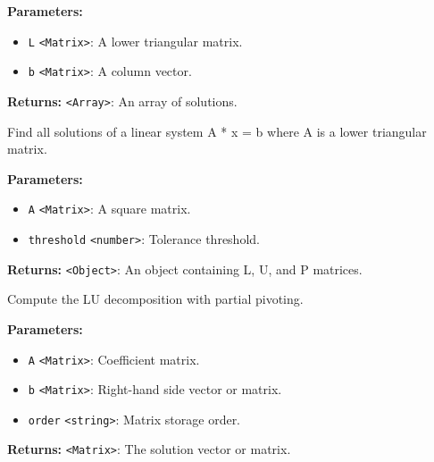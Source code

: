 \documentclass[12pt,a4paper]{article}
\begin{document}
\vspace{5mm}
\noindent {}


\noindent \textbf{Parameters:}
\begin{itemize}
  \item \texttt{L} \texttt{<Matrix>}: A lower triangular matrix.
  \item \texttt{b} \texttt{<Matrix>}: A column vector.
\end{itemize}

\noindent \textbf{Returns:} \texttt{<Array>}: An array of solutions.

\noindent Find all solutions of a linear system A * x = b where A is a lower triangular matrix.

\vspace{5mm}
\noindent {}


\noindent \textbf{Parameters:}
\begin{itemize}
  \item \texttt{A} \texttt{<Matrix>}: A square matrix.
  \item \texttt{threshold} \texttt{<number>}: Tolerance threshold.
\end{itemize}

\noindent \textbf{Returns:} \texttt{<Object>}: An object containing L, U, and P matrices.

\noindent Compute the LU decomposition with partial pivoting.

\vspace{5mm}
\noindent {}


\noindent \textbf{Parameters:}
\begin{itemize}
  \item \texttt{A} \texttt{<Matrix>}: Coefficient matrix.
  \item \texttt{b} \texttt{<Matrix>}: Right-hand side vector or matrix.
  \item \texttt{order} \texttt{<string>}: Matrix storage order.
\end{itemize}

\noindent \textbf{Returns:} \texttt{<Matrix>}: The solution vector or matrix.
\end{document}
